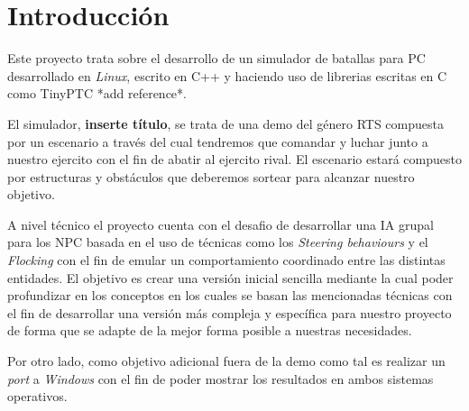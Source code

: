 \chapter{Introducción}

Este proyecto trata sobre el desarrollo de un simulador de batallas para \ac{PC}
desarrollado en \textit{Linux}, escrito en C++ y haciendo uso de librerias escritas en
C como TinyPTC *add reference*.

El simulador, \textbf{inserte título}, se trata de una demo del género \ac{RTS}
compuesta por un escenario a través del cual tendremos que comandar y luchar junto a
nuestro ejercito con el fin de abatir al ejercito rival. El escenario estará compuesto
por estructuras y obstáculos que deberemos sortear para alcanzar nuestro objetivo.

A nivel técnico el proyecto cuenta con el desafio de desarrollar una \ac{IA} grupal
para los \ac{NPC} basada en el uso de técnicas como los \textit{Steering behaviours} 
y el \textit{Flocking} con el fin de emular un comportamiento coordinado entre las
distintas entidades. El objetivo es crear una versión inicial sencilla mediante la 
cual poder profundizar en los conceptos en los cuales se basan las mencionadas técnicas
con el fin de desarrollar una versión más compleja y específica para nuestro proyecto
de forma que se adapte de la mejor forma posible a nuestras necesidades.

Por otro lado, como objetivo adicional fuera de la demo como tal es realizar
un \textit{port} a \textit{Windows} con el fin de poder mostrar los resultados
en ambos sistemas operativos.



